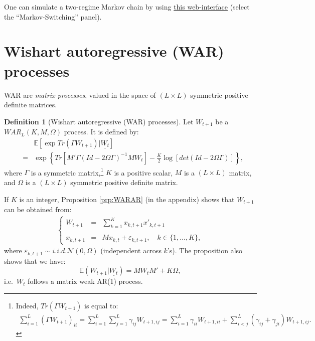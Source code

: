 \documentclass[
  12pt,
]{book}
\theoremstyle{definition}
\newtheorem{definition}{Definition}[chapter]
\theoremstyle{definition}
\theoremstyle{definition}
\theoremstyle{definition}
\theoremstyle{remark}
\begin{document}
One can simulate a two-regime Markov chain by using \href{https://jrenne.shinyapps.io/Affine/}{this web-interface} (select the ``Markov-Switching'' panel).

\hypertarget{WAR}{%
\section{Wishart autoregressive (WAR) processes}\label{WAR}}

WAR are \emph{matrix processes}, valued in the space of \((L \times L)\) symmetric positive
definite matrices.

\begin{definition}[Wishart autoregressive (WAR) processes]
\protect\hypertarget{def:WAR}{}\label{def:WAR}Let \(W_{t+1}\) be a \(WAR_L(K, M, \Omega)\) process. It is defined by:
\begin{eqnarray}
&&\mathbb{E}[\exp   Tr(\Gamma W_{t+1})|\underline{W_t}] \label{eq:Trace}\\
&=& \exp\left\{Tr[M'\Gamma(Id-2\Omega \Gamma)^{-1}M W_t]  -  \frac{K}{2}   \log [det(Id-2\Omega \Gamma)]\right\}, \nonumber
\end{eqnarray}
where \(\Gamma\) is a symmetric matrix,\footnote{Indeed, \(Tr(\Gamma W_{t+1})\) is equal to:
  \begin{eqnarray*}
  \sum^L_{i=1}(\Gamma W_{t+1})_{ii} = \sum^L_{i=1}  \sum^L_{j=1} \gamma_{ij} W_{t+1,ij} = \sum^L_{i=1} \gamma_{ii} W_{t+1,ii} + \sum^L_{i<j} (\gamma_{ij}+\gamma_{ji}) W_{t+1,ij}.
  \end{eqnarray*}} \(K\) is a positive scalar, \(M\) is a \((L \times L)\) matrix, and \(\Omega\) is a \((L \times L)\) symmetric positive definite matrix.
\end{definition}

If \(K\) is an integer, Proposition \ref{prp:WARAR} (in the appendix) shows that \(W_{t+1}\) can be obtained from:
\begin{eqnarray*}
\left\{
\begin{array}{ccl}
W_{t+1} & =&  \sum^K_{k=1} x_{k,t+1} x'_{k,t+1}\\
&&\\
x_{k,t+1} & =& M x_{k,t} + \varepsilon_{k,t+1},\quad k \in \{1,\dots,K\},
\end{array}
\right.
\end{eqnarray*}
where \(\varepsilon_{k,t+1} \sim i.i.d. \mathcal{N}(0, \Omega)\) (independent across \(k\)'s).
The proposition also shows that we have:
\[
\mathbb{E}(W_{t+1}|\underline{W_t}) = MW_tM'+K \Omega,
\]
i.e.~\(W_t\) follows a matrix weak AR(1) process.
\end{document}
